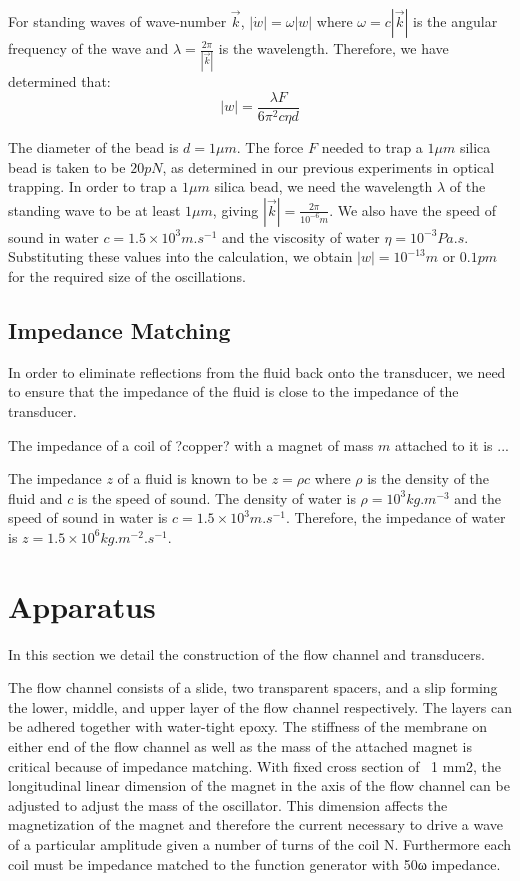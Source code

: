 For standing waves of wave-number $\vec{k}$, $|\dot{w}| = \omega |w|$ where $\omega = c |\vec{k}|$ is the angular frequency of the wave and $\lambda = \frac{2 \pi}{|\vec{k}|}$ is the wavelength. Therefore, we have determined that:
\begin{equation}
|w| = \frac{\lambda F}{6 \pi^2 c \eta d}
\end{equation}

The diameter of the bead is $d=1\mu m$. The force $F$ needed to trap a $1\mu m$ silica bead is taken to be $20pN$, as determined in our previous experiments in optical trapping.  In order to trap a $1\mu m$ silica bead, we need the wavelength $\lambda$ of the standing wave to be at least $1\mu m$, giving $|\vec{k}| = \frac{2 \pi}{10^{-6}m}$. We also have the speed of sound in water $c = 1.5 \times 10^3 m.s^{-1}$ and the viscosity of water $\eta = 10^{-3} Pa.s$. Substituting these values into the calculation, we obtain $|w| = 10^{-13}m$ or $0.1pm$ for the required size of the oscillations.

\subsection{Impedance Matching}

In order to eliminate reflections from the fluid back onto the transducer, we need to ensure that the impedance of the fluid is close to the impedance of the transducer. 

The impedance of a coil of ?copper? with a magnet of mass $m$ attached to it is ...

The impedance $z$ of a fluid is known to be $z = \rho c$ where $\rho$ is the density of the fluid and $c$ is the speed of sound. The density of water is $\rho = 10^3 kg.m^{-3}$ and the speed of sound in water is $c = 1.5 \times 10^3 m.s^{-1}$. Therefore, the impedance of water is $z = 1.5\times10^6 kg.m^{-2}.s^{-1}$.

\section{Apparatus}

In this section we detail the construction of the flow channel and transducers.

The flow channel consists of a slide, two transparent spacers, and a slip forming the lower, middle, and upper layer of the flow channel respectively. The layers can be adhered together with water-tight epoxy. The stiffness of the membrane on either end of the flow channel as well as the mass of the attached magnet is critical because of impedance matching. With fixed cross section of ~1 mm2, the longitudinal linear dimension of the magnet in the axis of the flow channel can be adjusted to adjust the mass of the oscillator. This dimension affects the magnetization of the magnet and therefore the current necessary to drive a wave of a particular amplitude given a number of turns of the coil N. Furthermore each coil must be impedance matched to the function generator with 50ω impedance.

